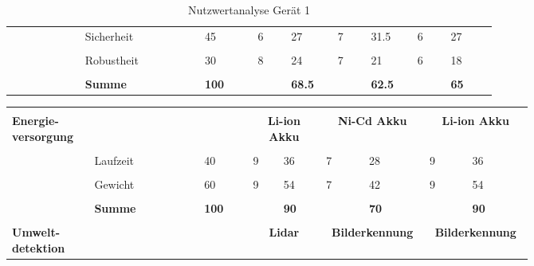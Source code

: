 \documentclass[main.tex]{subfiles} %
\begin{document}
\begin{landscape}
\begin{table}[ht]
\begin{tabular}{|p{0.11\linewidth}|p{0.18\linewidth}|p{0.085\linewidth}|p{0.057\linewidth}|p{0.07\linewidth}|p{0.057\linewidth}|p{0.07\linewidth}|p{0.057\linewidth}|p{0.07\linewidth}|}
            & Sicherheit & 45 & 6 & 27 & 7 & 31.5 & 6 & 27 \\[1pt]
            \cline{2-9}
            &&&&&&&&\\[-9pt]
            & Robustheit & 30 & 8 & 24 & 7 & 21 & 6 & 18 \\[1pt]
            \cline{2-9}
            &&&&&&&&\\[-9pt]
            & \textbf{Summe} & \textbf{100} &  & \textbf{68.5} &  & \textbf{62.5} &  & \textbf{65} \\[1pt]
            \hline
            \end{tabular}
        \caption{Nutzwertanalyse Gerät 1}
        \end{table}

        \newpage
        \begin{table}[ht]
        \centering
            \begin{tabular}{|p{0.11\linewidth}|p{0.18\linewidth}|p{0.085\linewidth}|p{0.057\linewidth}|p{0.07\linewidth}|p{0.057\linewidth}|p{0.07\linewidth}|p{0.057\linewidth}|p{0.07\linewidth}|}
            \hline
            & \multicolumn{2}{c|}{} & \multicolumn{2}{c|}{} & \multicolumn{2}{c|}{} & \multicolumn{2}{c|}{} \\[-9pt]
            \multirow{4}{4em}{\textbf{Energie-versorgung}} & \multicolumn{2}{c|}{} & \multicolumn{2}{c|}{\textbf{Li-ion Akku}} & \multicolumn{2}{c|}{\textbf{Ni-Cd Akku}} & \multicolumn{2}{c|}{\textbf{Li-ion Akku}} \\[1pt]
            \cline{2-9}
            &&&&&&&&\\[-9pt]
            & Laufzeit & 40 & 9 & 36 & 7 & 28 & 9 & 36 \\[1pt]
            \cline{2-9}
            &&&&&&&&\\[-9pt]
            & Gewicht & 60 & 9 & 54 & 7 & 42 & 9 & 54 \\[1pt]
            \cline{2-9}
            &&&&&&&&\\[-9pt]
            & \textbf{Summe} & \textbf{100} &  & \textbf{90} &  & \textbf{70} &  & \textbf{90} \\[1pt]
            \hline
            \hline
            & \multicolumn{2}{c|}{} & \multicolumn{2}{c|}{} & \multicolumn{2}{c|}{} & \multicolumn{2}{c|}{} \\[-9pt]
            \multirow{6}{4em}{\textbf{Umwelt-detektion}} & \multicolumn{2}{c|}{} & \multicolumn{2}{c|}{\textbf{Lidar}} & \multicolumn{2}{c|}{\textbf{Bilderkennung}} & \multicolumn{2}{c|}{\textbf{Bilderkennung}} \\[1pt]

\end{tabular}
\end{table}
\end{landscape}
\end{document}
